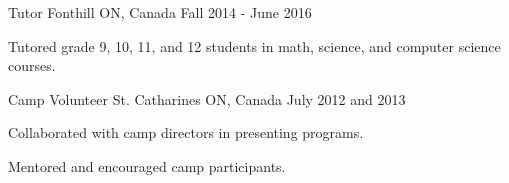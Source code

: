 
\begin{cventries}

   {Tutor}
  {Fonthill ON, Canada} {Fall 2014 - June 2016} {
    \begin{cvitems}
    \item Tutored grade 9, 10, 11, and 12 students in math, science, and
      computer science courses.
    \end{cvitems}
  }

   {Camp Volunteer} {St. Catharines ON, Canada} {July 2012 and
    2013} {
    \begin{cvitems}
    \item Collaborated with camp directors in presenting programs.
    \item Mentored and encouraged camp participants.
    \end{cvitems}
  }

\end{cventries}
